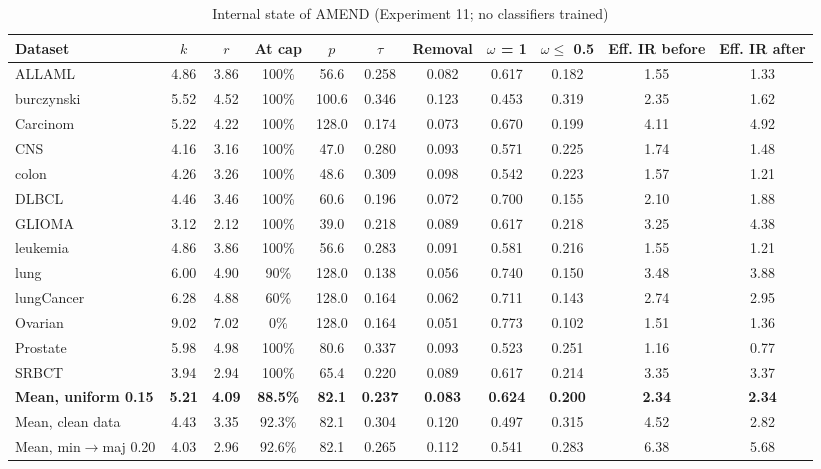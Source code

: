 \documentclass[conference]{IEEEtran}
\begin{document}
\begin{table}[!t]
\centering
\footnotesize
\caption{Internal state of AMEND (Experiment 11; no classifiers trained)}
\label{tab:15}
\setlength{\tabcolsep}{3.5pt}
\begin{adjustbox}{max width=\linewidth}
\begin{tabular}{lcccccccccc}
\hline
Dataset & $k$ & $r$ & At cap & $p$ & $\tau $ & Removal & $\omega $ = 1 & $\omega  \le $ 0.5 & Eff. IR before & Eff. IR after \\
\hline
ALLAML & 4.86 & 3.86 & 100\% & 56.6 & 0.258 & 0.082 & 0.617 & 0.182 & 1.55 & 1.33 \\
burczynski & 5.52 & 4.52 & 100\% & 100.6 & 0.346 & 0.123 & 0.453 & 0.319 & 2.35 & 1.62 \\
Carcinom & 5.22 & 4.22 & 100\% & 128.0 & 0.174 & 0.073 & 0.670 & 0.199 & 4.11 & 4.92 \\
CNS & 4.16 & 3.16 & 100\% & 47.0 & 0.280 & 0.093 & 0.571 & 0.225 & 1.74 & 1.48 \\
colon & 4.26 & 3.26 & 100\% & 48.6 & 0.309 & 0.098 & 0.542 & 0.223 & 1.57 & 1.21 \\
DLBCL & 4.46 & 3.46 & 100\% & 60.6 & 0.196 & 0.072 & 0.700 & 0.155 & 2.10 & 1.88 \\
GLIOMA & 3.12 & 2.12 & 100\% & 39.0 & 0.218 & 0.089 & 0.617 & 0.218 & 3.25 & 4.38 \\
leukemia & 4.86 & 3.86 & 100\% & 56.6 & 0.283 & 0.091 & 0.581 & 0.216 & 1.55 & 1.21 \\
lung & 6.00 & 4.90 & 90\% & 128.0 & 0.138 & 0.056 & 0.740 & 0.150 & 3.48 & 3.88 \\
lungCancer & 6.28 & 4.88 & 60\% & 128.0 & 0.164 & 0.062 & 0.711 & 0.143 & 2.74 & 2.95 \\
Ovarian & 9.02 & 7.02 & 0\% & 128.0 & 0.164 & 0.051 & 0.773 & 0.102 & 1.51 & 1.36 \\
Prostate & 5.98 & 4.98 & 100\% & 80.6 & 0.337 & 0.093 & 0.523 & 0.251 & 1.16 & 0.77 \\
SRBCT & 3.94 & 2.94 & 100\% & 65.4 & 0.220 & 0.089 & 0.617 & 0.214 & 3.35 & 3.37 \\
\textbf{Mean, uniform 0.15} & \textbf{5.21} & \textbf{4.09} & \textbf{88.5\%} & \textbf{82.1} & \textbf{0.237} & \textbf{0.083} & \textbf{0.624} & \textbf{0.200} & \textbf{2.34} & \textbf{2.34} \\
Mean, clean data & 4.43 & 3.35 & 92.3\% & 82.1 & 0.304 & 0.120 & 0.497 & 0.315 & 4.52 & 2.82 \\
Mean, min$\rightarrow $maj 0.20 & 4.03 & 2.96 & 92.6\% & 82.1 & 0.265 & 0.112 & 0.541 & 0.283 & 6.38 & 5.68 \\

\end{tabular}
\end{adjustbox}
\end{table}
\end{document}
